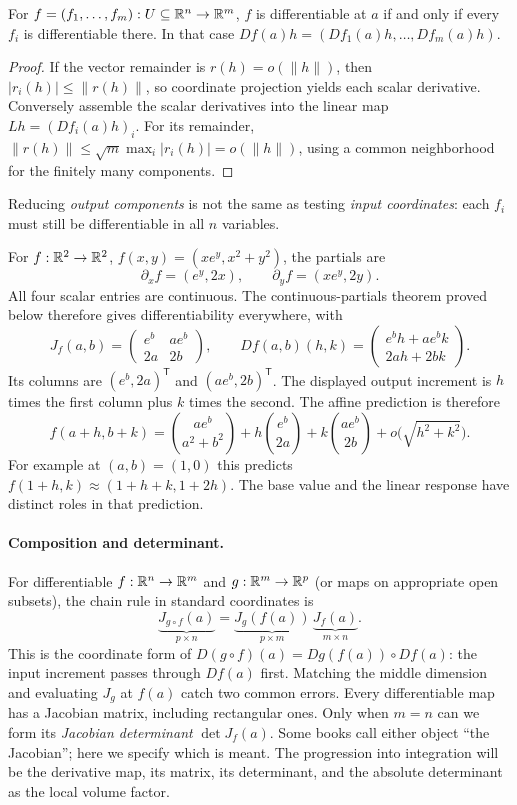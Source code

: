 \begin{proposition}\label{prop:componentwise-differentiability}
For $f=(f_1,\ldots,f_m):U\subseteq\mathbb{R}^n\to\mathbb{R}^m$, $f$ is differentiable
at $a$ if and only if every $f_i$ is differentiable there. In that case
$Df(a)h=(Df_1(a)h,\ldots,Df_m(a)h)$.
\end{proposition}
\begin{proof}
If the vector remainder is $r(h)=o(\|h\|)$, then
$|r_i(h)|\leq\|r(h)\|$, so coordinate projection yields each scalar
derivative. Conversely assemble the scalar derivatives into the linear
map $Lh=(Df_i(a)h)_i$. For its remainder,
$\|r(h)\|\leq\sqrt m\max_i|r_i(h)|=o(\|h\|)$,
using a common neighborhood for the finitely many components.
\end{proof}
Reducing \emph{output components} is not the same as testing \emph{input
coordinates}: each $f_i$ must still be differentiable in all $n$ variables.


\begin{example}
For $f:\mathbb{R}^2\to\mathbb{R}^2$, $f(x,y)=(xe^y,x^2+y^2)$, the partials are
\[
\partial_x f=(e^y,2x),\qquad \partial_y f=(xe^y,2y).
\]
All four scalar entries are continuous. The continuous-partials theorem
proved below therefore gives differentiability everywhere, with
\[
J_f(a,b)=\begin{pmatrix}e^b&ae^b\\2a&2b\end{pmatrix},\qquad
Df(a,b)(h,k)=\begin{pmatrix}e^bh+ae^bk\\2ah+2bk\end{pmatrix}.
\]
Its columns are $(e^b,2a)^{\mathsf T}$ and $(ae^b,2b)^{\mathsf T}$.
The displayed output increment is $h$ times the first column plus $k$
times the second. The affine prediction is therefore
\[
f(a+h,b+k)=\binom{ae^b}{a^2+b^2}
+h\binom{e^b}{2a}+k\binom{ae^b}{2b}
+o\bigl(\sqrt{h^2+k^2}\bigr).
\]
For example at $(a,b)=(1,0)$ this predicts
$f(1+h,k)\approx(1+h+k,1+2h)$. The base value and the linear response
have distinct roles in that prediction.
\end{example}

\paragraph{Composition and determinant.}
For differentiable $f:\mathbb{R}^n\to\mathbb{R}^m$ and $g:\mathbb{R}^m\to\mathbb{R}^p$ (or maps on
appropriate open subsets), the chain rule in standard coordinates is
\[
\underbrace{J_{g\circ f}(a)}_{p\times n}
=\underbrace{J_g(f(a))}_{p\times m}\,
\underbrace{J_f(a)}_{m\times n}.
\]
This is the coordinate form of $D(g\circ f)(a)=Dg(f(a))\circ Df(a)$:
the input increment passes through $Df(a)$ first. Matching the middle
dimension and evaluating $J_g$ at $f(a)$ catch two common errors.
Every differentiable map has a Jacobian matrix, including rectangular
ones. Only when $m=n$ can we form its \emph{Jacobian determinant}
$\det J_f(a)$. Some books call either object ``the Jacobian''; here we
specify which is meant. The progression into integration will be the
derivative map, its matrix, its determinant, and the absolute determinant
as the local volume factor.

